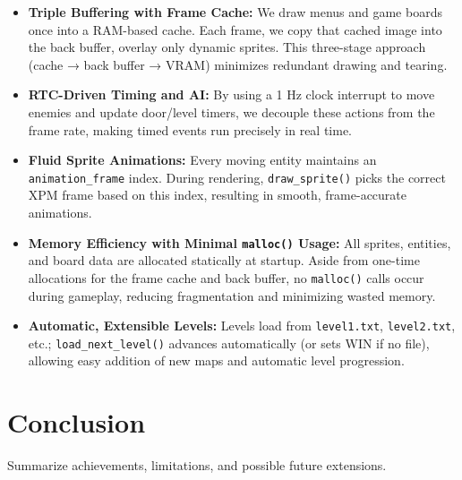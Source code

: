 \documentclass[12pt,a4paper]{article}
\newcommand{\func}[1]{\texttt{#1()}}
\newcommand{\var}[1]{\texttt{#1}}
\newcommand{\file}[1]{\texttt{#1}}
\begin{document}
\begin{itemize}
  \item \textbf{Triple Buffering with Frame Cache:}
    We draw menus and game boards once into a RAM-based cache. Each frame, we copy that cached image into the back buffer, overlay only dynamic sprites. This three-stage approach (cache → back buffer → VRAM) minimizes redundant drawing and tearing.

  \item \textbf{RTC-Driven Timing and AI:}
    By using a 1 Hz clock interrupt to move enemies and update door/level timers, we decouple these actions from the frame rate, making timed events run precisely in real time.

  \item \textbf{Fluid Sprite Animations:}
    Every moving entity maintains an \var{animation\_frame} index. During rendering, \func{draw\_sprite} picks the correct XPM frame based on this index, resulting in smooth, frame-accurate animations.

  \item \textbf{Memory Efficiency with Minimal \func{malloc} Usage:}
    All sprites, entities, and board data are allocated statically at startup. Aside from one-time allocations for the frame cache and back buffer, no \func{malloc} calls occur during gameplay, reducing fragmentation and minimizing wasted memory.

  \item \textbf{Automatic, Extensible Levels:}
    Levels load from \file{level1.txt}, \file{level2.txt}, etc.; \func{load\_next\_level} advances automatically (or sets WIN if no file), allowing easy addition of new maps and automatic level progression.
\end{itemize}


\section{Conclusion}
Summarize achievements, limitations, and possible future extensions. %
\end{document}
